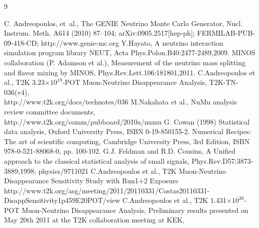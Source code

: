 \documentclass[final]{elsarticle}
\begin{document}









%
%
%
%


%
%

\begin{thebibliography}{9}

  C. Andreopoulos, et~al., {The GENIE Neutrino Monte Carlo Generator},
  Nucl. Instrum. Meth. A614 (2010) 87--104;
  arXiv:0905.2517[hep-ph];
  FERMILAB-PUB-09-418-CD; http://www.genie-mc.org
  Y.Hayato, A neutrino interaction simulation program library NEUT,
  Acta Phys.Polon.B40:2477-2489,2009.
  MINOS collaboration (P. Adamson et al.),
  Measurement of the neutrino mass splitting and flavor mixing by MINOS,
  Phys.Rev.Lett.106:181801,2011.
   C.Andreopoulos et al.,
   T2K 3.23$\times10^{19}$-POT Muon-Neutrino Disappearance Analysis,
   T2K-TN-036(v4),\\
   http://www.t2k.org/docs/technotes/036
   M.Nakahata et al.,
   NuMu analysis review committee documents,\\
   http://www.t2k.org/comm/pubboard/2010a/numu
  G. Cowan (1998) Statistical data analysis, 
  Oxford University Press, ISBN 0-19-850155-2.
  Numerical Recipes: The art of scientific computing, 
  Cambridge University Press, 3rd Edition, ISBN 978-0-521-88068-0, pp. 100-102.
  G.J. Feldman and R.D. Cousins,
  A Unified approach to the classical statistical analysis of small signals,
  Phys.Rev.D57:3873-3889,1998; physics/9711021
   C.Andreopoulos et al.,
   T2K Muon-Neutrino Disappearance Sensitivity Study with Run1+2 Exposure\\
   http://www.t2k.org/asg/meeting/2011/20110331/Costas20110331-DisappSensitivity1p459E20POT/view
   C.Andreopoulos et al.,
   T2K 1.431$\times10^{20}$-POT Muon-Neutrino Disappearance Analysis,
   Preliminary results presented on May 20th 2011
   at the T2K collaboration meeting at KEK,\\

\end{thebibliography}
\end{document}
